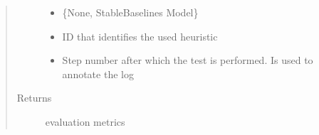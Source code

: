 \documentclass[letterpaper,10pt,english]{sphinxmanual}
\begin{document}
\begin{fulllineitems}
\begin{quote}
\begin{description}
\begin{itemize}
\item {} 
\sphinxAtStartPar
{} \textendash{} \{None, StableBaselines Model\}

\item {} 
\sphinxAtStartPar
{} \textendash{} ID that identifies the used heuristic

\item {} 
\sphinxAtStartPar
{} \textendash{} Step number after which the test is performed. Is used to annotate the log

\end{itemize}

\item[{Returns}] \leavevmode
\sphinxAtStartPar
evaluation metrics

\end{description}\end{quote}

\end{fulllineitems}

\end{document}
